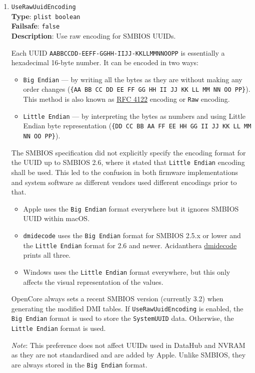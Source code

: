 \documentclass[]{article}
\providecommand{\tightlist}{%
  \setlength{\itemsep}{0pt}\setlength{\parskip}{0pt}}
\begin{document}
\begin{enumerate}
  \emph{Note}: A side effect of using the \texttt{Custom} approach that it
  makes SMBIOS updates exclusive to macOS, avoiding a collision with existing
  Windows activation and custom OEM software but potentially obstructing
  the operation of Apple-specific tools.
\item
  \texttt{UseRawUuidEncoding}\\
  \textbf{Type}: \texttt{plist\ boolean}\\
  \textbf{Failsafe}: \texttt{false}\\
  \textbf{Description}: Use raw encoding for SMBIOS UUIDs.

  Each UUID \texttt{AABBCCDD-EEFF-GGHH-IIJJ-KKLLMMNNOOPP} is
  essentially a hexadecimal 16-byte number. It can be encoded
  in two ways:

  \begin{itemize}
    \tightlist
    \item \texttt{Big Endian} --- by writing all the bytes as they are without making
      any order changes (\texttt{\{AA BB CC DD EE FF GG HH II JJ KK LL MM NN OO PP\}}).
      This method is also known as \href{https://tools.ietf.org/html/rfc4122}{RFC 4122}
      encoding or \texttt{Raw} encoding.
    \item \texttt{Little Endian} --- by interpreting the bytes as numbers and using
      Little Endian byte representation
      (\texttt{\{DD CC BB AA FF EE HH GG II JJ KK LL MM NN OO PP\}}).
  \end{itemize}

  The SMBIOS specification did not explicitly specify the encoding format for the
  UUID up to SMBIOS 2.6, where it stated that \texttt{Little Endian} encoding
  shall be used. This led to the confusion in both firmware implementations
  and system software as different vendors used different encodings prior to that.

  \begin{itemize}
    \tightlist
    \item Apple uses the \texttt{Big Endian} format everywhere but it ignores SMBIOS UUID within macOS.
    \item \texttt{dmidecode} uses the \texttt{Big Endian} format for SMBIOS 2.5.x or lower
    and the \texttt{Little Endian} format for 2.6 and newer. Acidanthera
    \href{https://github.com/acidanthera/dmidecode}{dmidecode} prints all three.
    \item Windows uses the \texttt{Little Endian} format everywhere, but this only affects
    the visual representation of the values.
  \end{itemize}

  OpenCore always sets a recent SMBIOS version (currently 3.2) when generating
  the modified DMI tables. If \texttt{UseRawUuidEncoding} is enabled, the \texttt{Big Endian}
  format is used to store the \texttt{SystemUUID} data. Otherwise, the \texttt{Little Endian}
  format is used.

  \emph{Note}: This preference does not affect UUIDs used in DataHub and NVRAM
  as they are not standardised and are added by Apple. Unlike SMBIOS, they are
  always stored in the \texttt{Big Endian} format.

\end{enumerate}
\end{document}
